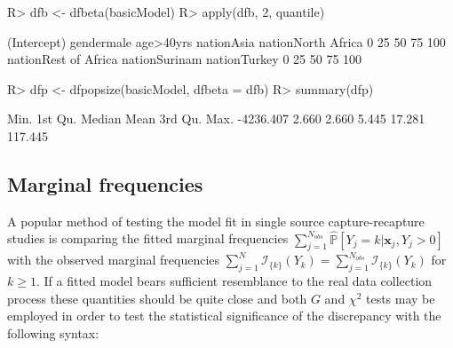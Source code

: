 \documentclass[
]{jss}
\newcommand{\1}{\mathcal{I}} \newcommand{\bx}{\boldsymbol{x}}
\begin{document}
\begin{CodeChunk}
\begin{CodeInput}
R> dfb <- dfbeta(basicModel)
R> apply(dfb, 2, quantile)
\end{CodeInput}
\begin{CodeOutput}
       (Intercept)    gendermale     age>40yrs    nationAsia nationNorth Africa
0%
25%
50%
75%
100%
     nationRest of Africa nationSurinam  nationTurkey
0%
25%
50%
75%
100%
\end{CodeOutput}
\end{CodeChunk}

\normalsize

\begin{CodeChunk}
\begin{CodeInput}
R> dfp <- dfpopsize(basicModel, dfbeta = dfb)
R> summary(dfp)
\end{CodeInput}
\begin{CodeOutput}
     Min.   1st Qu.    Median      Mean   3rd Qu.      Max. 
-4236.407     2.660     2.660     5.445    17.281   117.445 
\end{CodeOutput}
\end{CodeChunk}

\subsection{Marginal frequencies}\label{marginal-frequencies}

A popular method of testing the model fit in single source
capture-recapture studies is comparing the fitted marginal frequencies
\(\displaystyle\sum_{j=1}^{N_{obs}}\hat{\mathbb{P}}\left[Y_{j}=k|\boldsymbol{x}_{j}, Y_{j} > 0\right]\)
with the observed marginal frequencies
\(\displaystyle\sum_{j=1}^{N}\mathcal{I}_{\{k\}}(Y_{k})=\sum_{j=1}^{N_{obs}}\mathcal{I}_{\{k\}}(Y_{k})\)
for \(k\geq1\). If a fitted model bears sufficient resemblance to the
real data collection process these quantities should be quite close and
both \(G\) and \(\chi^{2}\) tests may be employed in order to test the
statistical significance of the discrepancy with the following
 syntax:
\end{document}
